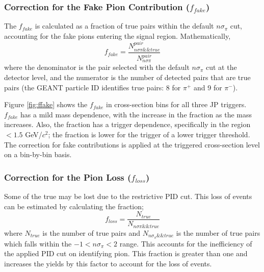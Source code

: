 \subsubsection{Correction for the Fake Pion Contribution ($ f_{fake}$)}
\label{subsec:ffake}
The $f_{fake}$ is calculated as a fraction of true \dipion pairs within the default $n\sigma_\pi$ cut, accounting for the fake pions entering the signal region. Mathematically, 
\begin{equation}
    f_{fake} = \frac{N^{pair}_{n\sigma\pi \&\& true}}{N^{pair}_{n\sigma\pi}}
\end{equation}
where the denominator is the \dipion pair selected with the default $n\sigma_\pi$ cut at the detector level, and the numerator is the number of detected pairs that are true pairs (the GEANT particle ID identifies true pairs: 8 for $\pi^+$ and 9 for $\pi^-$).


Figure \ref{fig:ffake} shows the $f_{fake}$ in \mpair  cross-section bins for all three JP triggers. $f_{fake}$ has a mild mass dependence, with the increase in the fraction as the mass increases. Also, the fraction has a trigger dependence, specifically in the region \mpair $<1.5$ GeV/$c^2$; the fraction is lower for the trigger of a lower trigger threshold. The correction for fake contributions is applied at the triggered cross-section level on a bin-by-bin basis.

\subsubsection{Correction for the  Pion Loss ($f_{loss}$)}
\label{subsec:floss}
Some of the true \dipion may be lost due to the restrictive PID cut. This loss of \dipion events can be estimated by calculating the fraction; 
\begin{equation}
    f_{loss} = \frac{N_{true}}{N_{n\sigma\pi \&\& true}}
\end{equation}
where $N_{true}$ is the number of true \dipion pairs and $N_{n\sigma_\pi\&\& true}$ is the number of true \dipion pairs which falls within the $-1<n\sigma_\pi<2$ range. This accounts for the inefficiency of the applied PID cut on identifying pion. This fraction is greater than one and increases the yields by this factor to account for the loss of \dipion events.


